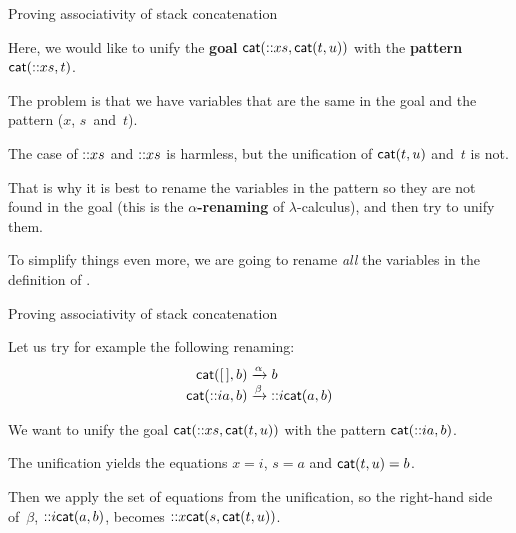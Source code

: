 %
\begin{frame}{Proving associativity of stack concatenation}

  Here, we would like to unify the \textbf{goal}
  \(\textsf{cat}(\textsf{::}{x}{s},\textsf{cat}(t,u))\) with the \textbf{pattern}
  \(\textsf{cat}(\textsf{::}{x}{s},t)\).

  \bigskip

  The problem is that we have variables that are the same in the goal
  and the pattern (\(x\), \(s\)~and~\(t\)).

  \bigskip

  The case of \(\textsf{::}{x}{s}\) and \(\textsf{::}{x}{s}\) is harmless, but the
  unification of \(\textsf{cat}(t,u)\) and~\(t\) is not.

  \bigskip

  That is why it is best to rename the variables in the pattern so
  they are not found in the goal (this is the
  \textbf{\(\alpha\)\hyp{}renaming} of \(\lambda\)\hyp{}calculus), and
  then try to unify them.

  \bigskip

  To simplify things even more, we are going to rename \emph{all} the
  variables in the definition of .

\end{frame}

%
\begin{frame}{Proving associativity of stack concatenation}

  Let us try for example the following renaming:
  \begin{align*}
    \textsf{cat}(        [\,],b) &\xrightarrow{\alpha} b\\
    \textsf{cat}(\textsf{::}{i}{a},b) &\xrightarrow{\smash{\beta}}
    \textsf{::}{i}{\textsf{cat}(a,b)}
  \end{align*}

  We want to unify the goal \(\textsf{cat}(\textsf{::}{x}{s},\textsf{cat}(t,u))\)
  with the pattern \(\textsf{cat}(\textsf{::}{i}{a},b)\).

  \bigskip

  The unification yields the equations \(x = i\), \(s = a\) and
  \(\textsf{cat}(t,u) = b\).

  \bigskip

  Then we apply the set of equations from the unification, so the
  right\hyp{}hand side of~\(\beta\), \(\textsf{::}{i}{\textsf{cat}(a,b)}\),
  becomes \(\textsf{::}{x}{\textsf{cat}(s,\textsf{cat}(t,u))}\).

\end{frame}

